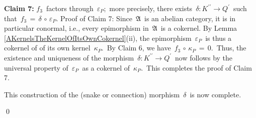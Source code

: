 \begin{enumerate}
	\vskip 0.3cm
	\textbf{Claim 7:} \;$f_{3}$\, factors through \,$\varepsilon_{P}$;\,
	more precisely, there exists
	\,$\delta : K^{\prime\prime} \longrightarrow Q^{\prime}$\,
	such that
	\,$f_{3} \,=\, \delta \,\circ\, \varepsilon_{P}$.
	\vskip 0.01cm
	Proof of Claim 7:\;
	Since \,$\mathfrak{A}$\, is an abelian category, it is in particular conormal, i.e.,
	every epimorphism in \,$\mathfrak{A}$\, is a cokernel.
	By Lemma \ref{AKernelsTheKernelOfItsOwnCokernel}(ii),
	the epimorphism \,$\varepsilon_{P}$\, is thus a cokernel of of its own kernel \,$\kappa_{P}$.\,
	By Claim 6, we have \,$f_{3} \,\circ\, \kappa_{P} \,=\, 0$.\,
	Thus, the existence and uniqueness of the morphism
	\,$\delta : K^{\prime\prime} \longrightarrow Q^{\prime}$\,
	now follows by the universal property of
	\,$\varepsilon_{P}$\, as a cokernel of \,$\kappa_{P}$.\,
	This completes the proof of Claim 7.


	\vskip 0.3cm
	This construction of the (snake or connection) morphism \,$\delta$\, is now complete.
\end{enumerate}
\qed

